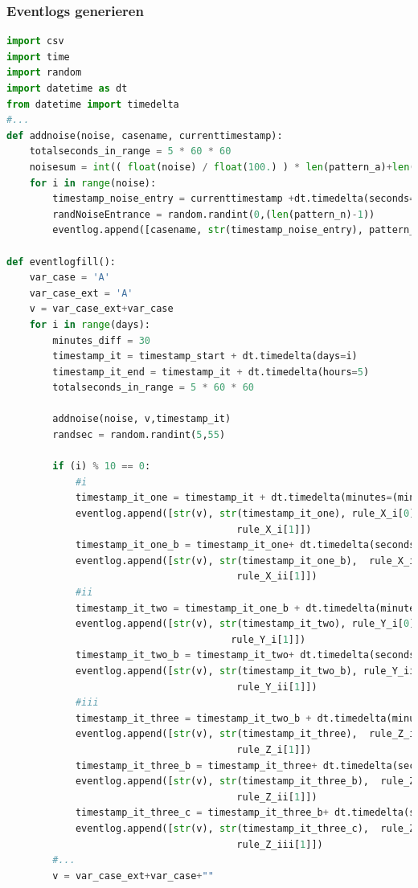 \clearpage
\subsubsection{Eventlogs generieren}\label{lst:generate}
\small
\begin{lstlisting}[language=Python]
import csv
import time
import random
import datetime as dt
from datetime import timedelta
#...
def addnoise(noise, casename, currenttimestamp):
    totalseconds_in_range = 5 * 60 * 60
    noisesum = int(( float(noise) / float(100.) ) * len(pattern_a)+len(pattern_b))
    for i in range(noise):
        timestamp_noise_entry = currenttimestamp +dt.timedelta(seconds=random.randint(0,totalseconds_in_range))
        randNoiseEntrance = random.randint(0,(len(pattern_n)-1))
        eventlog.append([casename, str(timestamp_noise_entry), pattern_n[randNoiseEntrance][0],  pattern_n[randNoiseEntrance][0]+" "+pattern_n[randNoiseEntrance][1]])
        
def eventlogfill():
    var_case = 'A'
    var_case_ext = 'A'
    v = var_case_ext+var_case
    for i in range(days):
        minutes_diff = 30
        timestamp_it = timestamp_start + dt.timedelta(days=i)
        timestamp_it_end = timestamp_it + dt.timedelta(hours=5)
        totalseconds_in_range = 5 * 60 * 60
        
        addnoise(noise, v,timestamp_it)
        randsec = random.randint(5,55)
    
        if (i) % 10 == 0:
            #i
            timestamp_it_one = timestamp_it + dt.timedelta(minutes=(minutes_diff))
            eventlog.append([str(v), str(timestamp_it_one), rule_X_i[0],  
                                        rule_X_i[1]])
            timestamp_it_one_b = timestamp_it_one+ dt.timedelta(seconds=80+3*randsec)
            eventlog.append([str(v), str(timestamp_it_one_b),  rule_X_ii[0],  
                                        rule_X_ii[1]])
            #ii
            timestamp_it_two = timestamp_it_one_b + dt.timedelta(minutes=(minutes_diff))            
            eventlog.append([str(v), str(timestamp_it_two), rule_Y_i[0],  
                                       rule_Y_i[1]])
            timestamp_it_two_b = timestamp_it_two+ dt.timedelta(seconds=80+3*randsec)        
            eventlog.append([str(v), str(timestamp_it_two_b), rule_Y_ii[0],  
                                        rule_Y_ii[1]])
            #iii
            timestamp_it_three = timestamp_it_two_b + dt.timedelta(minutes=(minutes_diff))        
            eventlog.append([str(v), str(timestamp_it_three),  rule_Z_i[0],  
                                        rule_Z_i[1]])
            timestamp_it_three_b = timestamp_it_three+ dt.timedelta(seconds=80+3*randsec)
            eventlog.append([str(v), str(timestamp_it_three_b),  rule_Z_ii[0],  
                                        rule_Z_ii[1]])
            timestamp_it_three_c = timestamp_it_three_b+ dt.timedelta(seconds=80+3*randsec)
            eventlog.append([str(v), str(timestamp_it_three_c),  rule_Z_iii[0],  
                                        rule_Z_iii[1]])
        #...
        v = var_case_ext+var_case+""
        

\end{lstlisting}

